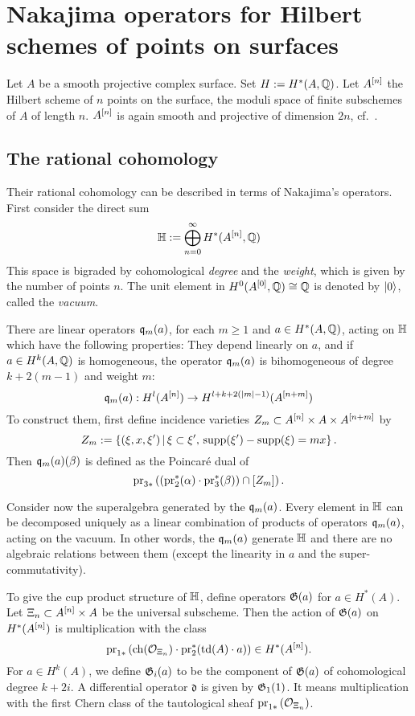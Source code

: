 \section{Nakajima operators for Hilbert schemes of points on surfaces}

Let $A$ be a smooth projective complex surface. Set $H:=H^*(A,\mathbb{Q})$. Let $A^{[n]}$ the Hilbert scheme of $n$ points on the surface, \ie the moduli space of finite subschemes of $A$ of length $n$.
$A^{[n]}$ is again smooth and projective of dimension $2n$, cf.~\cite{Fogarty}. 
\subsection{The rational cohomology}
Their rational cohomology can be described in terms of Nakajima's \cite{Nakajima} operators. First consider the direct sum
$$
\mathbb{H} := \bigoplus_{n=0}^{\infty} H^*(A^{[n]},\mathbb{Q})
$$
This space is bigraded by cohomological \emph{degree} and the \emph{weight}, which is given by the number of points $n$. The unit element in $H^0(A^{[0]},\mathbb{Q}) \cong \mathbb{Q}$ is denoted by $|0\rangle$, called the \emph{vacuum}.
\begin{definition}
There are linear operators $\mathfrak{q}_m(a)$, for each $m\geq 1$ and $a \in H^*(A,\mathbb{Q})$, acting on $\mathbb{H}$ which have the following properties: They depend linearly on $a$, and if $a\in H^k(A,\mathbb{Q})$ is homogeneous, the operator $\mathfrak{q}_{m}(a)$ is bihomogeneous of degree $k+2(m-1)$ and weight $m$:
$$
\mathfrak{q}_{m}(a) : H^l(A^{[n]}) \rightarrow H^{l+k+2(|m|-1)}(A^{[n+m]})
$$
To construct them, first define incidence varieties $Z_m\subset A^{[n]}\times A\times A^{[n+m]}$ by
$$
Z_m := \left\{(\xi,x,\xi')\, |\, \xi\subset\xi',\, \operatorname{supp}(\xi') -\operatorname{supp}(\xi) = mx \right\}.
$$
Then $\mathfrak{q}_m(a)(\beta) $ is defined as the Poincar\'e dual of 
$$
\operatorname{pr}_{3*}\left( \left(\operatorname{pr}_2^*(\alpha)\cdot \operatorname{pr}_3^*(\beta)\right) \cap [Z_m] \right).
$$
\end{definition}
Consider now the superalgebra generated by the $\mathfrak{q}_m(a)$. 
Every element in $\mathbb{H}$ can be decomposed uniquely as a linear combination of products of operators $\mathfrak{q}_{m}(a)$, acting on the vacuum. 
In other words, the $\mathfrak{q}_m(a)$ generate $\mathbb{H}$ and there are no algebraic relations between them (except the linearity in $a$ and the super-commutativity).
\begin{definition}
To give the cup product structure of $\mathbb{H}$, define operators $\mathfrak{G}(a)$ for $a \in H^*(A)$. Let $\Xi_n \subset A^{[n]}\times A$ be the universal subscheme. Then the action of $\mathfrak{G}(a)$ on $H^*(A^{[n]})$ is multiplication with the class
$$
\operatorname{pr}_{1*}\left( \operatorname{ch}(\mathcal{O}_{\Xi_n})\cdot \operatorname{pr}_2^*(\operatorname{td}(A)\cdot a) \right) \in H^*(A^{[n]}).
$$
For $a \in H^k(A)$, we define $\mathfrak{G}_i(a)$ to be the component of $\mathfrak{G}(a)$ of cohomological degree $k+2i$. A differential operator $\mathfrak{d}$ is given by $\mathfrak{G}_1(1)$. It means multiplication with the first Chern class of the tautological sheaf $\operatorname{pr}_{1*}\left( \mathcal{O}_{\Xi_n}\right)$.
\end{definition}
